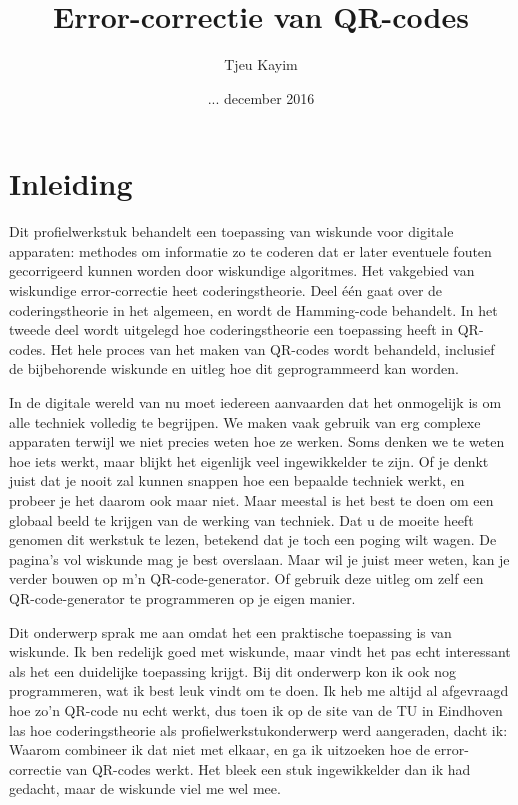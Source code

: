 \documentclass{article}
\title{Error-correctie van QR-codes}
\author{Tjeu Kayim}
\date{... december 2016}
\begin{document}
\newcommand*\xor{\mathbin{\oplus}}
\def\blockms#1{\begin{minipage}{\linewidth} \texttt{#1}\end{minipage}}
\def\boldms#1{\texttt{\textbf{#1}}}
\renewcommand*\contentsname{Inhoud}
\maketitle
\newpage
\tableofcontents

\section{Inleiding}
Dit profielwerkstuk behandelt een toepassing van wiskunde voor digitale apparaten: methodes om informatie zo te coderen dat er later eventuele fouten gecorrigeerd kunnen worden door wiskundige algoritmes. Het vakgebied van wiskundige error-correctie heet coderingstheorie. Deel één gaat over de coderingstheorie in het algemeen, en wordt de Hamming-code behandelt. In het tweede deel wordt uitgelegd hoe coderingstheorie een toepassing heeft in QR-codes. Het hele proces van het maken van QR-codes wordt behandeld, inclusief de bijbehorende wiskunde en uitleg hoe dit geprogrammeerd kan worden.

In de digitale wereld van nu moet iedereen aanvaarden dat het onmogelijk is om alle techniek volledig te begrijpen. We maken vaak gebruik van erg complexe apparaten terwijl we niet precies weten hoe ze werken. Soms denken we te weten hoe iets werkt, maar blijkt het eigenlijk veel ingewikkelder te zijn. Of je denkt juist dat je nooit zal kunnen snappen hoe een bepaalde techniek werkt, en probeer je het daarom ook maar niet. Maar meestal is het best te doen om een globaal beeld te krijgen van de werking van techniek. Dat u de moeite heeft genomen dit werkstuk te lezen, betekend dat je toch een poging wilt wagen. De pagina's vol wiskunde mag je best overslaan. Maar wil je juist meer weten, kan je verder bouwen op m'n QR-code-generator. Of gebruik deze uitleg om zelf een QR-code-generator te programmeren op je eigen manier.

Dit onderwerp sprak me aan omdat het een praktische toepassing is van wiskunde. Ik ben redelijk goed met wiskunde, maar vindt het pas echt interessant als het een duidelijke toepassing krijgt. Bij dit onderwerp kon ik ook nog programmeren, wat ik best leuk vindt om te doen. Ik heb me altijd al afgevraagd hoe zo'n QR-code nu echt werkt, dus toen ik op de site van de TU in Eindhoven las hoe coderingstheorie als profielwerkstukonderwerp werd aangeraden, dacht ik: Waarom combineer ik dat niet met elkaar, en ga ik uitzoeken hoe de error-correctie van QR-codes werkt. Het bleek een stuk ingewikkelder dan ik had gedacht, maar de wiskunde viel me wel mee.
\end{document}
